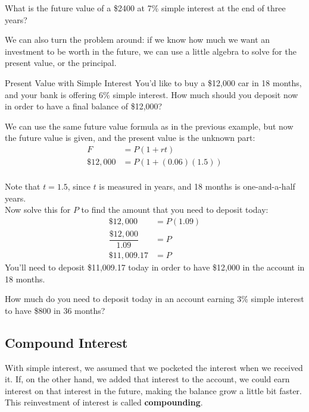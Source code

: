 \begin{try}
What is the future value of a \$2400 at 7\% simple interest at the end of three years?
\end{try}
\vfill

We can also turn the problem around: if we know how much we want an investment to be worth in the future, we can use a little algebra to solve for the present value, or the principal.
\vfill

\begin{example}{Present Value with Simple Interest}
You'd like to buy a \$12,000 car in 18 months, and your bank is offering 6\% simple interest.  How much should you deposit now in order to have a final balance of \$12,000?

\solline
{}
We can use the same future value formula as in the previous example, but now the future value is given, and the present value is the unknown part:
\begin{align*}
F &= P(1+rt)\\
\$12,000 &= P(1+(0.06)(1.5))\\
\end{align*}

Note that $t=1.5$, since $t$ is measured in years, and 18 months is one-and-a-half years.\\

Now solve this for $P$ to find the amount that you need to deposit today:
\begin{align*}
\$12,000 &= P(1.09)\\
\dfrac{\$12,000}{1.09} &= P\\
\boxed{\$11,009.17} &= P
\end{align*}
You'll need to deposit \$11,009.17 today in order to have \$12,000 in the account in 18 months.
\end{example}
\vfill

\begin{try}
How much do you need to deposit today in an account earning 3\% simple interest to have \$800 in 36 months?
\end{try}
\vfill
\pagebreak

\subsection{Compound Interest}
With simple interest, we assumed that we pocketed the interest when we received it.  If, on the other hand, we added that interest to the account, we could earn interest on that interest in the future, making the balance grow a little bit faster.  This reinvestment of interest is called \textbf{compounding}.\\

